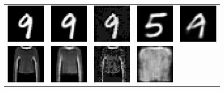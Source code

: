 \begin{figure}
    \centering
    \begin{tabular}{ccccc}
        \includegraphics[width=0.1\linewidth]{pics/3_adv_att/mnist_ref_4.pdf} & \includegraphics[width=0.1\linewidth]{pics/3_adv_att/mnist_ref_rec_4.pdf} &
        \includegraphics[width=0.1\linewidth]{pics/3_adv_att/mnist_adv_4.pdf} & \includegraphics[width=0.1\linewidth]{pics/3_adv_att/mnist_adv_rec_4.pdf} & 
        \includegraphics[width=0.1\linewidth]{pics/3_adv_att/mnist_adv_rec_hmc_4.pdf}\\
        \includegraphics[width=0.1\linewidth]{pics/3_adv_att/fashion_mnist_ref_14.pdf} & \includegraphics[width=0.1\linewidth]{pics/3_adv_att/fashion_mnist_ref_rec_14.pdf} &
        \includegraphics[width=0.1\linewidth]{pics/3_adv_att/fashion_mnist_adv_14.pdf} & \includegraphics[width=0.1\linewidth]{pics/3_adv_att/fashion_mnist_adv_rec_14.pdf} & 

\end{tabular}
\end{figure}

